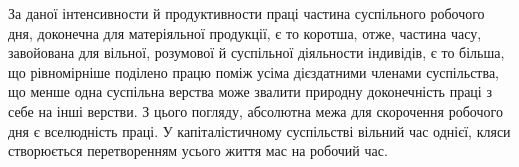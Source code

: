 За даної інтенсивности й продуктивности праці частина суспільного
робочого дня, доконечна для матеріяльної продукції,
є то коротша, отже, частина часу, завойована для вільної, розумової
й суспільної діяльности індивідів, є то більша, що рівномірніше
поділено працю поміж усіма дієздатними членами суспільства,
що менше одна суспільна верства може звалити природну
доконечність праці з себе на інші верстви. З цього погляду,
абсолютна межа для скорочення робочого дня є вселюдність праці.
У капіталістичному суспільстві вільний час однієї, кляси створюється
перетворенням усього життя мас на робочий час.
